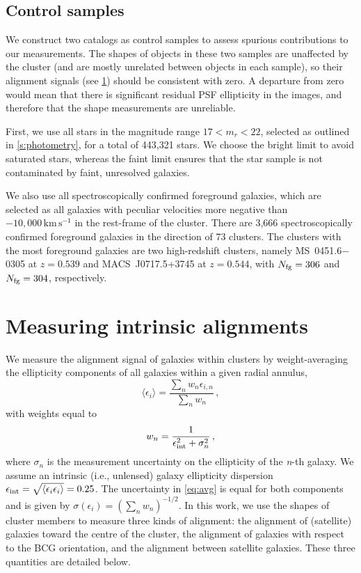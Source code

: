 \subsection{Control samples}\label{s:control}

We construct two catalogs as control samples to assess spurious contributions to our measurements. 
The shapes of objects in these two samples are unaffected by the cluster (and are mostly unrelated 
between objects in each sample), so their alignment signals (see \cref{s:ia}) should be consistent 
with zero. A departure from zero would mean that there is significant residual PSF ellipticity in 
the images, and therefore that the shape measurements are unreliable.

First, we use all stars in the magnitude range $17<m_r<22$, selected as outlined in 
\cref{s:photometry}, for a total of 443,321 stars. We choose the bright limit to avoid saturated 
stars, whereas the faint limit ensures that the star sample is not contaminated by faint, 
unresolved galaxies.

We also use all spectroscopically confirmed foreground galaxies, which are selected as all galaxies 
with peculiar velocities more negative than $-10,000\,\!\mathrm{km\,s^{-1}}$ in the rest-frame of 
the cluster. There are 3,666 spectroscopically confirmed foreground galaxies in the direction of 73 
clusters. The clusters with the most foreground galaxies are two high-redshift clusters, namely MS~0451.6$-$0305 at $z=0.539$ and MACS~J0717.5+3745 at $z=0.544$, with 
$N_{\rm fg}=306$ and $N_{\rm fg}=304$, respectively.


\section{Measuring intrinsic alignments}\label{s:ia}

We measure the alignment signal of galaxies within clusters by weight-averaging the ellipticity 
components of all galaxies within a given radial annulus,
\begin{equation}\label{eq:avg}
 \langle\epsilon_i\rangle = \frac{\sum_n w_n \epsilon_{i,n}}{\sum_n w_n}\,,
\end{equation}
with weights equal to
\begin{equation}
 w_n = \frac1{\epsilon_{\rm int}^2 + \sigma_n^2}\,,
\end{equation}
where $\sigma_n$ is the measurement uncertainty on the ellipticity of the {\it n}-th galaxy. We 
assume an intrinsic (i.e., unlensed) galaxy ellipticity dispersion $\epsilon_{\rm 
int}=\sqrt{\langle\epsilon_i\epsilon_i\rangle}=0.25$. The uncertainty in \cref{eq:avg} is equal for 
both components and is given by $\sigma(\epsilon_i) = \left(\sum_nw_n\right)^{-1/2}$. In this work, 
we use the shapes of cluster members to measure three kinds of alignment: the alignment of 
(satellite) galaxies toward the centre of the cluster, the alignment of galaxies with respect to 
the BCG orientation, and the alignment between satellite galaxies. These three quantities are 
detailed below.

